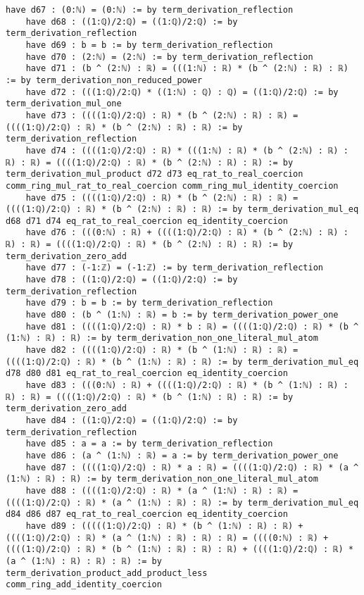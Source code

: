 \documentclass{article}
\begin{document}
\begin{tcolorbox}[colback=white!10, width=\linewidth]
\begin{lstlisting}[language=Lean4]
    have d67 : (0:ℕ) = (0:ℕ) := by term_derivation_reflection
    have d68 : ((1:ℚ)/2:ℚ) = ((1:ℚ)/2:ℚ) := by term_derivation_reflection
    have d69 : b = b := by term_derivation_reflection
    have d70 : (2:ℕ) = (2:ℕ) := by term_derivation_reflection
    have d71 : (b ^ (2:ℕ) : ℝ) = (((1:ℕ) : ℝ) * (b ^ (2:ℕ) : ℝ) : ℝ) := by term_derivation_non_reduced_power
    have d72 : (((1:ℚ)/2:ℚ) * ((1:ℕ) : ℚ) : ℚ) = ((1:ℚ)/2:ℚ) := by term_derivation_mul_one
    have d73 : ((((1:ℚ)/2:ℚ) : ℝ) * (b ^ (2:ℕ) : ℝ) : ℝ) = ((((1:ℚ)/2:ℚ) : ℝ) * (b ^ (2:ℕ) : ℝ) : ℝ) := by term_derivation_reflection
    have d74 : ((((1:ℚ)/2:ℚ) : ℝ) * (((1:ℕ) : ℝ) * (b ^ (2:ℕ) : ℝ) : ℝ) : ℝ) = ((((1:ℚ)/2:ℚ) : ℝ) * (b ^ (2:ℕ) : ℝ) : ℝ) := by term_derivation_mul_product d72 d73 eq_rat_to_real_coercion comm_ring_mul_rat_to_real_coercion comm_ring_mul_identity_coercion
    have d75 : ((((1:ℚ)/2:ℚ) : ℝ) * (b ^ (2:ℕ) : ℝ) : ℝ) = ((((1:ℚ)/2:ℚ) : ℝ) * (b ^ (2:ℕ) : ℝ) : ℝ) := by term_derivation_mul_eq d68 d71 d74 eq_rat_to_real_coercion eq_identity_coercion
    have d76 : (((0:ℕ) : ℝ) + ((((1:ℚ)/2:ℚ) : ℝ) * (b ^ (2:ℕ) : ℝ) : ℝ) : ℝ) = ((((1:ℚ)/2:ℚ) : ℝ) * (b ^ (2:ℕ) : ℝ) : ℝ) := by term_derivation_zero_add
    have d77 : (-1:ℤ) = (-1:ℤ) := by term_derivation_reflection
    have d78 : ((1:ℚ)/2:ℚ) = ((1:ℚ)/2:ℚ) := by term_derivation_reflection
    have d79 : b = b := by term_derivation_reflection
    have d80 : (b ^ (1:ℕ) : ℝ) = b := by term_derivation_power_one
    have d81 : ((((1:ℚ)/2:ℚ) : ℝ) * b : ℝ) = ((((1:ℚ)/2:ℚ) : ℝ) * (b ^ (1:ℕ) : ℝ) : ℝ) := by term_derivation_non_one_literal_mul_atom
    have d82 : ((((1:ℚ)/2:ℚ) : ℝ) * (b ^ (1:ℕ) : ℝ) : ℝ) = ((((1:ℚ)/2:ℚ) : ℝ) * (b ^ (1:ℕ) : ℝ) : ℝ) := by term_derivation_mul_eq d78 d80 d81 eq_rat_to_real_coercion eq_identity_coercion
    have d83 : (((0:ℕ) : ℝ) + ((((1:ℚ)/2:ℚ) : ℝ) * (b ^ (1:ℕ) : ℝ) : ℝ) : ℝ) = ((((1:ℚ)/2:ℚ) : ℝ) * (b ^ (1:ℕ) : ℝ) : ℝ) := by term_derivation_zero_add
    have d84 : ((1:ℚ)/2:ℚ) = ((1:ℚ)/2:ℚ) := by term_derivation_reflection
    have d85 : a = a := by term_derivation_reflection
    have d86 : (a ^ (1:ℕ) : ℝ) = a := by term_derivation_power_one
    have d87 : ((((1:ℚ)/2:ℚ) : ℝ) * a : ℝ) = ((((1:ℚ)/2:ℚ) : ℝ) * (a ^ (1:ℕ) : ℝ) : ℝ) := by term_derivation_non_one_literal_mul_atom
    have d88 : ((((1:ℚ)/2:ℚ) : ℝ) * (a ^ (1:ℕ) : ℝ) : ℝ) = ((((1:ℚ)/2:ℚ) : ℝ) * (a ^ (1:ℕ) : ℝ) : ℝ) := by term_derivation_mul_eq d84 d86 d87 eq_rat_to_real_coercion eq_identity_coercion
    have d89 : (((((1:ℚ)/2:ℚ) : ℝ) * (b ^ (1:ℕ) : ℝ) : ℝ) + ((((1:ℚ)/2:ℚ) : ℝ) * (a ^ (1:ℕ) : ℝ) : ℝ) : ℝ) = ((((0:ℕ) : ℝ) + ((((1:ℚ)/2:ℚ) : ℝ) * (b ^ (1:ℕ) : ℝ) : ℝ) : ℝ) + ((((1:ℚ)/2:ℚ) : ℝ) * (a ^ (1:ℕ) : ℝ) : ℝ) : ℝ) := by term_derivation_product_add_product_less comm_ring_add_identity_coercion

\end{lstlisting}
\end{tcolorbox}
\end{document}
